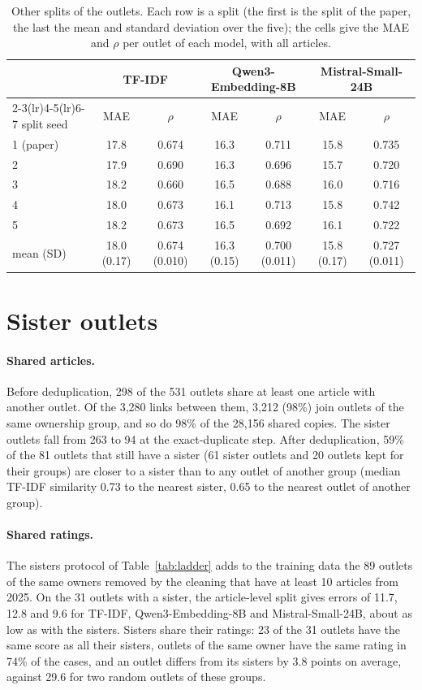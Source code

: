 \documentclass[11pt,a4paper]{article}
\begin{document}
\begin{table}[h]
\centering
\caption{Other splits of the outlets. Each row is a split (the first is the split of the paper, the last the mean and
standard deviation over the five); the cells give the MAE and $\rho$ per outlet of each model, with all
articles.}\label{tab:splits}
\small\setlength{\tabcolsep}{4pt}
\begin{tabular}{lcccccc}
\toprule
& \multicolumn{2}{c}{TF-IDF} & \multicolumn{2}{c}{Qwen3-Embedding-8B} & \multicolumn{2}{c}{Mistral-Small-24B} \\
\cmidrule(lr){2-3}\cmidrule(lr){4-5}\cmidrule(lr){6-7}
split seed & MAE & $\rho$ & MAE & $\rho$ & MAE & $\rho$ \\
\midrule
1 (paper) & 17.8 & 0.674 & 16.3 & 0.711 & 15.8 & 0.735 \\
2 & 17.9 & 0.690 & 16.3 & 0.696 & 15.7 & 0.720 \\
3 & 18.2 & 0.660 & 16.5 & 0.688 & 16.0 & 0.716 \\
4 & 18.0 & 0.673 & 16.1 & 0.713 & 15.8 & 0.742 \\
5 & 18.2 & 0.673 & 16.5 & 0.692 & 16.1 & 0.722 \\
\midrule
mean (SD) & 18.0 (0.17) & 0.674 (0.010) & 16.3 (0.15) & 0.700 (0.011) & 15.8 (0.17) & 0.727 (0.011) \\
\bottomrule
\end{tabular}
\end{table}

\section{Sister outlets}\label{app:sisters}
\paragraph{Shared articles.} Before deduplication, 298 of the 531 outlets share at least one article with another
outlet. Of the 3,280 links between them, 3,212 (98\%) join outlets of the same ownership group, and so do 98\% of the
28,156 shared copies. The sister outlets fall from 263 to 94 at the exact-duplicate step. After deduplication, 59\% of
the 81 outlets that still have a sister (61 sister outlets and 20 outlets kept for their groups) are closer to a sister
than to any outlet of another group (median TF-IDF similarity 0.73 to the nearest sister, 0.65 to the nearest outlet of
another group).

\paragraph{Shared ratings.} The sisters protocol of Table~\ref{tab:ladder} adds to the training data the 89 outlets of the
same owners removed by the cleaning that have at least 10 articles from 2025. On the 31 outlets with a sister, the
article-level split gives errors of 11.7, 12.8 and 9.6 for TF-IDF, Qwen3-Embedding-8B and Mistral-Small-24B, about as low
as with the sisters. Sisters share their ratings: 23 of the 31 outlets have the same score as all their sisters,
outlets of the same owner have the same rating in 74\% of the cases, and an outlet differs from its sisters by 3.8
points on average, against 29.6 for two random outlets of these groups.
\end{document}
